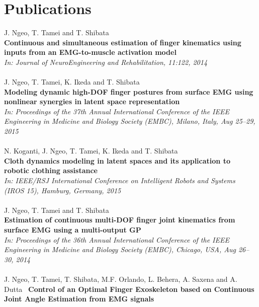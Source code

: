 \documentclass[]{friggeri-cv}
\begin{document}


\section{Publications}
J. Ngeo, T. Tamei and T. Shibata\\
\textbf{Continuous and simultaneous estimation of finger kinematics
using inputs from an EMG-to-muscle activation model}\\
\small{\emph{In: Journal of NeuroEngineering and Rehabilitation, 11:122, 2014}}
\\
\\
J. Ngeo, T. Tamei, K. Ikeda and T. Shibata\\
\textbf{Modeling dynamic high-DOF finger postures
from surface EMG using nonlinear synergies in latent space representation}\\
\small{\emph{In: Proceedings of the 37th Annual International Conference of the IEEE Engineering in Medicine and Biology Society (EMBC), Milano, Italy, Aug 25–29, 2015}}
\\
\\
 N. Koganti, J. Ngeo, T. Tamei, K. Ikeda and T. Shibata\\
\textbf{Cloth dynamics modeling in latent spaces and its application to robotic clothing assistance}\\
\small{\emph{In: IEEE/RSJ International Conference on Intelligent Robots and Systems (IROS 15), Hamburg, Germany, 2015}}
\\
\\
J. Ngeo, T. Tamei and T. Shibata\\
\textbf{Estimation of continuous multi-DOF finger joint kinematics from surface EMG using a multi-output GP}\\
\small{\emph{In: Proceedings of the 36th Annual International Conference of the IEEE Engineering in Medicine and Biology Society (EMBC), Chicago, USA, Aug 26–30, 2014}}
\\
\\
J. Ngeo, T. Tamei, T. Shibata, M.F. Orlando, L. Behera, A. Saxena and A. Dutta\
\textbf{ Control of an Optimal Finger Exoskeleton based on Continuous Joint Angle Estimation from EMG signals}\\
\end{document}
